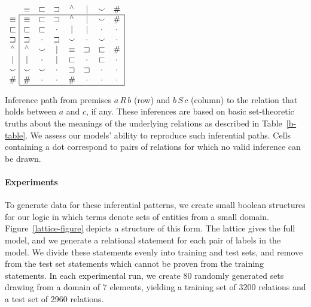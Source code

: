 \begin{table}[htp]
  \centering  \small
  \setlength{\arraycolsep}{8pt}
  \renewcommand{\arraystretch}{1.1}
  \newcommand{\UNK}{\cdot}  
  $\begin{array}[t]{c@{ \ }|*{7}{c}|}
    \multicolumn{1}{c}{}
             & \nateq     & \natfor     & \natrev     & \natneg    & \natalt     & \natcov     & \multicolumn{1}{c}{\natind} \\
    \cline{2-8}
    \nateq  & \nateq &   \natfor &  \natrev &  \natneg &   \natalt &  \natcov &  \natind \\
    \natfor & \natfor &  \natfor &  \UNK &  \natalt &   \natalt &  \UNK &  \UNK \\
    \natrev & \natrev &  \UNK &  \natrev &  \natcov &   \UNK &  \natcov &  \UNK \\
    \natneg & \natneg &  \natcov &  \natalt &  \nateq &    \natrev &  \natfor &  \natind \\
    \natalt & \natalt &  \UNK &  \natalt &  \natfor &   \UNK &  \natfor &  \UNK \\
    \natcov & \natcov &  \natcov &  \UNK &  \natrev &   \natrev &  \UNK &  \UNK \\
    \natind & \natind & \UNK &  \UNK &  \natind &  \UNK &  \UNK &  \UNK \\
    \cline{2-8}
  \end{array}$
  \caption{Inference path from premises $a\,R\,b$ (row) and $b\,S\,c$ (column) to the relation that holds between $a$ and $c$, if any.  These inferences are based on basic set-theoretic truths about the meanings of the underlying relations as described in Table~\ref{b-table}. We assess our models' ability to reproduce such inferential paths. Cells containing a dot correspond to pairs
of relations for which no valid inference can be drawn.}
  \label{tab:jointable}
\end{table}

\paragraph{Experiments}
To generate data for these inferential patterns, we
create small boolean structures for our logic in which terms denote
sets of entities from a small domain.  Figure~\ref{lattice-figure}
depicts a structure of this form. The lattice gives the full model,
and we generate a relational statement for each pair of labels in the model. 
We divide these statements evenly into training and test sets, and remove from the
test set statements which cannot be proven from the training
statements.
In each experimental run, we create 80 randomly generated sets drawing from
a domain of 7 elements, yielding a training set of 3200 relations and a test set of 
2960 relations.

